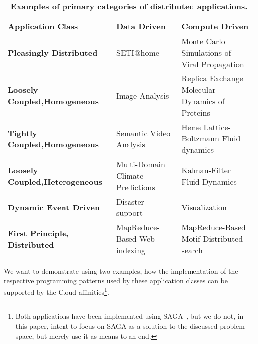 \documentclass{article}
\newcommand{\B}[1]{\textbf{#1}}
\newcommand{\NL}{\newline}
\begin{document}
 \begin{table}[h]
  \begin{center}
   \footnotesize
   \begin{tabular}{|p{}|p{}|p{}|}
     \hline
 
     \B{Application Class}                                 &
     \B{Data    Driven}                                    &
     \B{Compute Driven}                                    \\\hline
 
     \B{Pleasingly Distributed}                            &
        SETI$@$home                                        &
        Monte Carlo Simulations of Viral Propagation       \\\hline
 
     \B{Loosely Coupled,\NL Homogeneous}                    &
        Image Analysis                                     &
        Replica Exchange Molecular Dynamics of Proteins    \\\hline
 
     \B{Tightly Coupled,\NL Homogeneous}                    &
        Semantic Video Analysis                            &
        Heme Lattice-Boltzmann Fluid dynamics              \\\hline
 
     \B{Loosely Coupled,\NL Heterogeneous}                 &
        Multi-Domain Climate Predictions                   &
        Kalman-Filter Fluid Dynamics                       \\\hline
 
     \B{Dynamic Event Driven}                              &
        Disaster support                                   &
        Visualization                                      \\\hline
 
     \B{First Principle, Distributed}                      &
        MapReduce-Based Web indexing                       &
        MapReduce-Based Motif Distributed search           \\\hline
 
   \end{tabular}
   \caption{\footnotesize \B{Examples of primary categories 
            of distributed applications\cite{dpa_paper}.}}
   \label{tab:classes}
  \end{center}
 \end{table}

 We want to demonstrate using two examples, how the implementation of the
 respective programming patterns used by these application classes can
 be supported by the Cloud affinities\footnote{Both applications have
 been implemented using SAGA~\cite{saga-core}, but we do not, in this
 paper, intent to focus on SAGA as a solution to the discussed problem
 space, but merely use it as means to an end.}.
\end{document}
